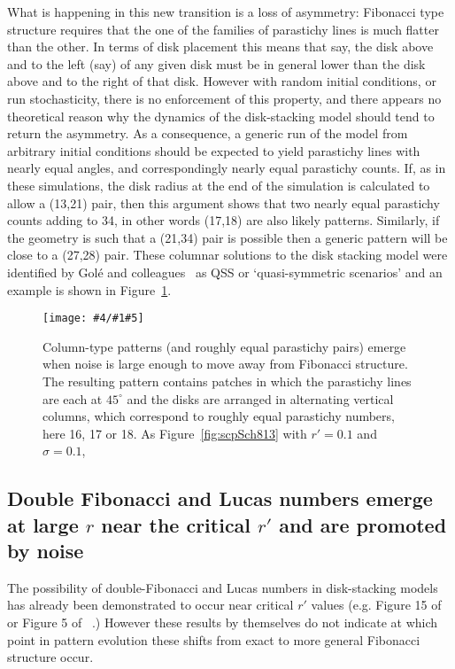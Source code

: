 \documentclass[a4paper,10pt]{amsart}
\newlength{\jfigwidth}
\newcommand{\pdffig}[3]{\jdofig{#1}{#2}{#3}{Figures}{.pdf}}
\newcommand{\jdofig}[5]{
	\begin{figure}\centering\texttt{[image: \#4/\#1\#5]} \caption{#2}\label{fig:#1}\end{figure}
}
\begin{document}
What is happening in this new transition is a loss of asymmetry:  Fibonacci type structure requires that the one of the families of parastichy lines is much flatter than the other. In terms of disk placement this means that say, the disk above and to the left (say) of any given disk must be in general lower than the disk above and to the right of that disk. However with random initial conditions, or run stochasticity, there is no enforcement of this property, and there appears no theoretical reason why the dynamics of the disk-stacking model should tend to return the asymmetry. As a consequence, a generic run of the model from arbitrary initial conditions should be expected to yield parastichy lines with nearly equal angles, and correspondingly nearly equal parastichy counts. If, as in these simulations, the disk radius at the end of the simulation is calculated to allow a (13,21) pair, then this argument shows that two nearly equal parastichy counts adding to 34, in other words (17,18) are also likely patterns. Similarly, if the geometry is such that a (21,34) pair is possible then a generic pattern will be close to a (27,28) pair. These columnar solutions to the disk stacking model were identified by Gol\'e and colleagues~\cite{goleFibonacciQuasisymmetricPhyllotaxis2016} as QSS or `quasi-symmetric scenarios'  and an example is shown in Figure~\ref{fig:scpColumn}.
\pdffig{scpColumn}{Column-type patterns (and roughly equal parastichy pairs) emerge when noise is large enough to move away from Fibonacci structure. The resulting pattern contains patches in which the parastichy lines are each at $45^\circ$ and the disks are arranged in alternating vertical columns, which correspond to roughly equal parastichy numbers, here 16, 17 or 18. As Figure~\ref{fig:scpSch813} with $r'=0.1$ and $\sigma=0.1$, }{1}

\subsection{Double Fibonacci and Lucas numbers emerge at large $r$ near the critical $r'$ and are promoted by noise}
The possibility of double-Fibonacci and Lucas numbers in disk-stacking models has already been demonstrated to occur near critical $r'$ values (e.g. Figure 15 of~\cite{goleFibonacciQuasisymmetricPhyllotaxis2016} or Figure 5 of ~\cite{yonekuraMathematicalModelStudies2019}.) However these results by themselves do not indicate at which point in pattern evolution these shifts from exact to more general Fibonacci structure occur. 
\end{document}
